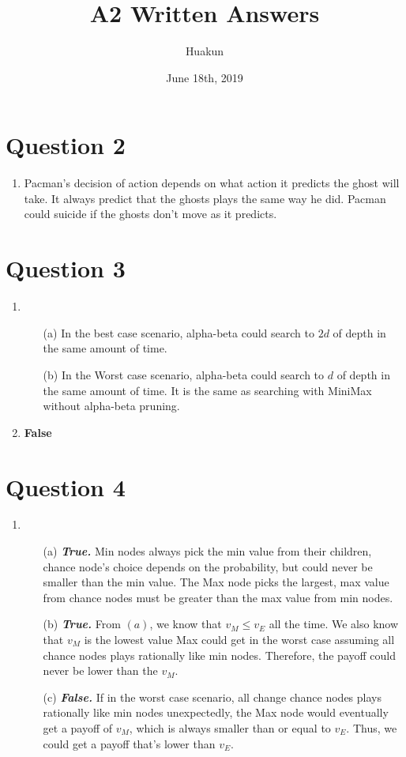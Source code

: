 \documentclass[10pt]{article}
\title{A2 Written Answers}
\author{Huakun}
\date{June 18th, 2019}
\begin{document}
\maketitle
\section*{Question 2}
\begin{enumerate}
\item Pacman's decision of action depends on what action it predicts the ghost will take. It always predict that the ghosts plays the same way he did. Pacman could suicide if the ghosts don't move as it predicts.
\end{enumerate}
\section*{Question 3}
\begin{enumerate}
\item 
	\begin{enumerate}
		\item[(a)] In the best case scenario, alpha-beta could search to $2d$ of depth in the same amount of time.
		\item[(b)] In the Worst case scenario, alpha-beta could search to $d$ of depth in the same amount of time. It is the same as searching with MiniMax without alpha-beta pruning.
	\end{enumerate}
\item \textbf{False}
\end{enumerate}
\section*{Question 4}
\begin{enumerate}
\item
	\begin{enumerate}
	\item[(a)] \textbf{\textit{True.}} Min nodes always pick the min value from their children, chance node's choice depends on the probability, but could never be smaller than the min value. The Max node picks the largest, max value from chance nodes must be greater than the max value from min nodes.
	\item[(b)] \textbf{\textit{True.}} From $(a)$, we know that $v_M\leq v_E$ all the time. We also know that $v_M$ is the lowest value Max could get in the worst case assuming all chance nodes plays rationally like min nodes. Therefore, the payoff could never be lower than the $v_M$.
	\item[(c)] \textbf{\textit{False.}} If in the worst case scenario, all change chance nodes plays rationally like min nodes unexpectedly, the Max node would eventually get a payoff of $v_M$, which is always smaller than or equal to $v_E$. Thus, we could get a payoff that's lower than $v_E$.
	\end{enumerate}
\end{enumerate}
\end{document}
